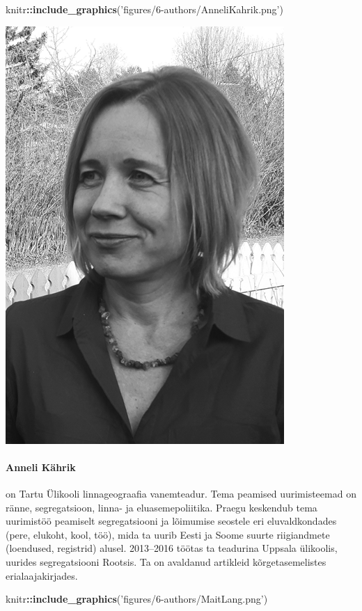 \documentclass[estonian,]{article}
\newenvironment{Shaded}{\begin{snugshade}}{\end{snugshade}}
\newcommand{\KeywordTok}[1]{\textcolor[rgb]{0.13,0.29,0.53}{\textbf{#1}}}
\newcommand{\NormalTok}[1]{#1}
\newcommand{\OperatorTok}[1]{\textcolor[rgb]{0.81,0.36,0.00}{\textbf{#1}}}
\newcommand{\StringTok}[1]{\textcolor[rgb]{0.31,0.60,0.02}{#1}}
\let\oldparagraph\paragraph
\renewcommand{\paragraph}[1]{\oldparagraph{#1}\mbox{}}
\begin{document}
\begin{Shaded}
\begin{Highlighting}[]
\NormalTok{knitr}\OperatorTok{::}\KeywordTok{include_graphics}\NormalTok{(}\StringTok{'figures/6-authors/AnneliKahrik.png'}\NormalTok{)}
\end{Highlighting}
\end{Shaded}

\begin{flushleft}\includegraphics[width=0.5\linewidth]{figures/6-authors/AnneliKahrik} \end{flushleft}

\hypertarget{anneli-kuxe4hrik}{%
\paragraph{Anneli Kährik}\label{anneli-kuxe4hrik}}

on Tartu Ülikooli linnageograafia vanemteadur. Tema peamised uurimisteemad on ränne, segregatsioon, linna- ja eluasemepoliitika. Praegu keskendub tema uurimistöö peamiselt segregatsiooni ja lõimumise seostele eri eluvaldkondades (pere, elukoht, kool, töö), mida ta uurib Eesti ja Soome suurte riigiandmete (loendused, registrid) alusel. 2013--2016 töötas ta teadurina Uppsala ülikoolis, uurides segregatsiooni Rootsis. Ta on avaldanud artikleid kõrgetasemelistes erialaajakirjades.

\begin{Shaded}
\begin{Highlighting}[]
\NormalTok{knitr}\OperatorTok{::}\KeywordTok{include_graphics}\NormalTok{(}\StringTok{'figures/6-authors/MaitLang.png'}\NormalTok{)}
\end{Highlighting}
\end{Shaded}
\end{document}
